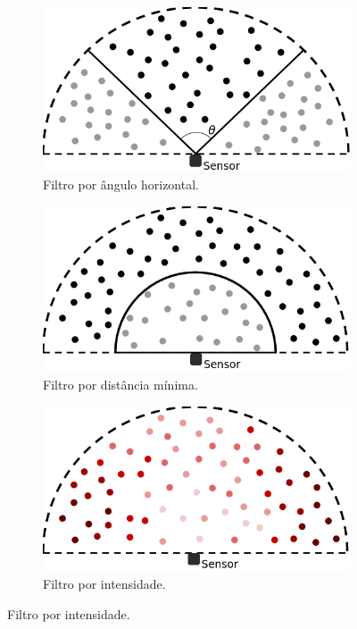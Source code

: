 \begin{figure}[H]
    \centering
    \caption{Filtros simples de remoção de \textit{outliers}.}
    \begin{subfigure}[t]{0.4\textwidth}
        \includegraphics[width=\textwidth]{dados/figuras/angle_filter.png}
        \caption{Filtro por ângulo horizontal.}
        \label{fig:angle_filter}
    \end{subfigure}
    \hspace{3em}
    \begin{subfigure}[t]{0.4\textwidth}
        \includegraphics[width=\textwidth]{dados/figuras/distance_filter.png}
        \caption{Filtro por distância mínima.}
        \label{fig:distance_filter}
    \end{subfigure}
    \begin{subfigure}[t]{0.4\textwidth}
        \includegraphics[width=\textwidth]{dados/figuras/intensity_filter.png}
        \caption{Filtro por intensidade.}
        \label{fig:intensity_filter}
    \end{subfigure}
\end{figure}


